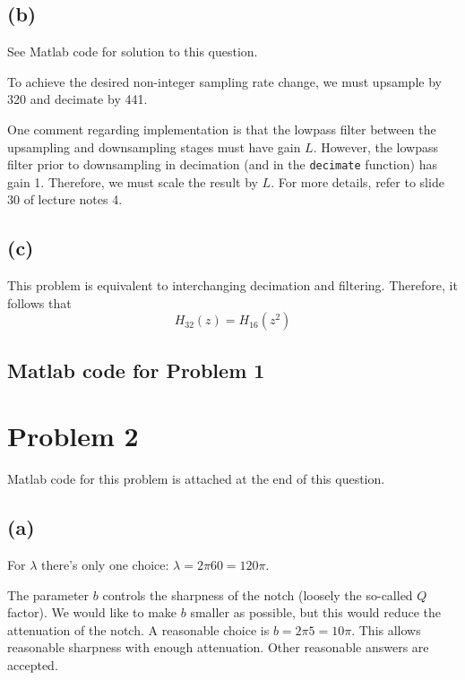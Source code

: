 \documentclass{article}
\begin{document}
\FloatBarrier

\subsection{(b)}

See Matlab code for solution to this question.

To achieve the desired non-integer sampling rate change, we must upsample by 320 and decimate by 441.

One comment regarding implementation is that the lowpass filter between the upsampling and downsampling stages must have gain $L$. However, the lowpass filter prior to downsampling in decimation (and in the \texttt{decimate} function) has gain 1. Therefore, we must scale the result by $L$. For more details, refer to slide 30 of lecture notes 4.

\subsection{(c)}

This problem is equivalent to interchanging decimation and filtering. Therefore, it follows that
\begin{equation}
	H_{32}(z) = H_{16}(z^2)
\end{equation}

\subsection{Matlab code for Problem 1}



\section{Problem 2}

Matlab code for this problem is attached at the end of this question.

\subsection{(a)}

For $\lambda$ there's only one choice: $\lambda = 2\pi60 = 120\pi$.

The parameter $b$ controls the sharpness of the notch (loosely the so-called $Q$ factor). We would like to make $b$ smaller as possible, but this would reduce the attenuation of the notch. A reasonable choice is $b = 2\pi 5 = 10\pi$. This allows reasonable sharpness with enough attenuation. Other reasonable answers are accepted.
\end{document}
